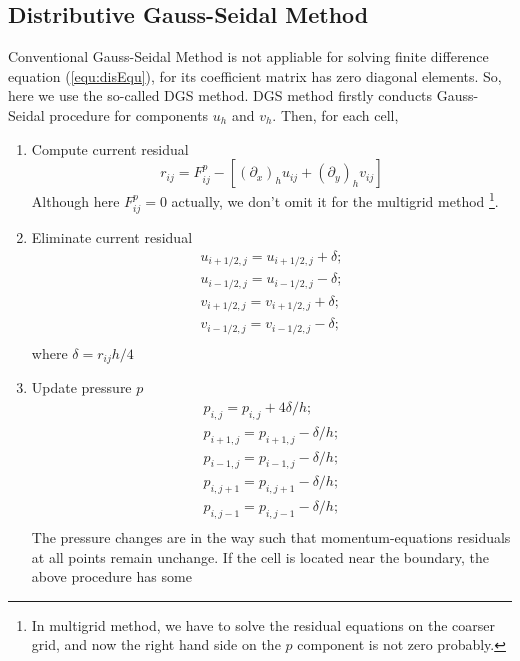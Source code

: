 \subsection{Distributive Gauss-Seidal Method}
Conventional Gauss-Seidal Method  is not appliable for solving 
finite difference equation (\ref{equ:disEqu}), 
for its coefficient matrix has zero diagonal elements. So, here we use the so-called
DGS method. DGS method firstly conducts Gauss-Seidal procedure for components $u_h$ and $v_h$.
Then, for each cell,
\begin{enumerate}
    \item Compute current residual
    $$r_{ij}=F^p_{ij}-[(\partial_x)_h u_{ij}+(\partial_y)_h v_{ij}]$$
    Although here $F^p_{ij}=0$ actually, we don't omit it for the multigrid method
    \footnote{In multigrid method, we have to solve the residual equations on the 
    coarser grid, and now the right hand side on the $p$ component is not zero probably.}.
    \item Eliminate current residual
        \begin{equation}
            \begin{array}{l}
            u_{i+1/2,j}=u_{i+1/2,j}+\delta;\\
            u_{i-1/2,j}=u_{i-1/2,j}-\delta;\\
            v_{i+1/2,j}=v_{i+1/2,j}+\delta;\\
            v_{i-1/2,j}=v_{i-1/2,j}-\delta;\\
            \end{array}
        \end{equation}
        where $\delta=r_{ij}h/4$
    \item Update pressure $p$
        \begin{equation}
            \begin{array}{l}
            p_{i,j}=p_{i,j}+4\delta/h;\\
            p_{i+1,j}=p_{i+1,j}-\delta/h;\\
            p_{i-1,j}=p_{i-1,j}-\delta/h;\\
            p_{i,j+1}=p_{i,j+1}-\delta/h;\\
            p_{i,j-1}=p_{i,j-1}-\delta/h;\\
            \end{array}
        \end{equation}
        The pressure changes are in the way such that momentum-equations residuals 
        at all points remain unchange.
        If the cell is located near the boundary, the above procedure has some 

\end{enumerate}
